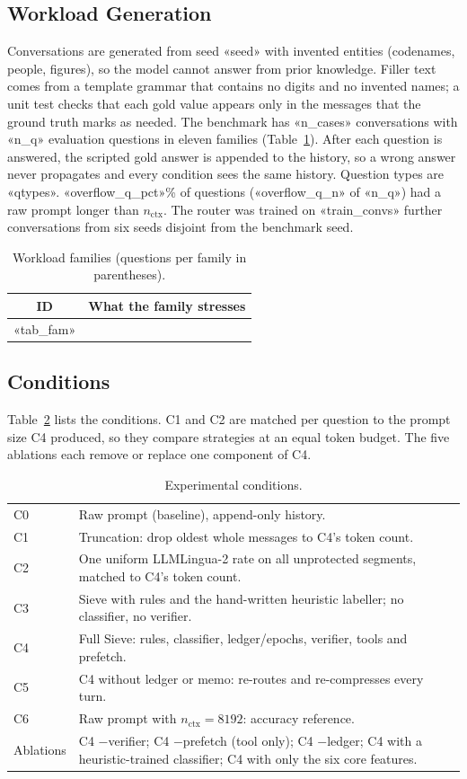 \documentclass[journal]{IEEEtran}
\begin{document}
\subsection{Workload Generation}
Conversations are generated from seed «seed» with invented entities (codenames, people, figures), so the model cannot answer from
prior knowledge. Filler text comes from a template grammar that contains no digits and no invented names; a unit test checks that
each gold value appears only in the messages that the ground truth marks as needed. The benchmark has «n_cases» conversations with
«n_q» evaluation questions in eleven families (Table~\ref{tab:fam}). After each question is answered, the scripted gold answer is
appended to the history, so a wrong answer never propagates and every condition sees the same history. Question types are
«qtypes». «overflow_q_pct»\% of questions («overflow_q_n» of «n_q») had a raw prompt longer than $n_\text{ctx}$. The router was
trained on «train_convs» further conversations from six seeds disjoint from the benchmark seed.
\begin{table}[t]\centering\caption{Workload families (questions per family in parentheses).}\label{tab:fam}\footnotesize
\begin{tabular}{cl}\toprule ID & What the family stresses\\\midrule
«tab_fam»
\bottomrule\end{tabular}\end{table}

\subsection{Conditions}
Table~\ref{tab:cond} lists the conditions. C1 and C2 are matched per question to the prompt size C4 produced, so they compare
strategies at an equal token budget. The five ablations each remove or replace one component of C4.
\begin{table}[t]\centering\caption{Experimental conditions.}\label{tab:cond}\footnotesize\setlength{\tabcolsep}{3pt}
\begin{tabular}{lp{}}\toprule
C0 & Raw prompt (baseline), append-only history.\\
C1 & Truncation: drop oldest whole messages to C4's token count.\\
C2 & One uniform LLMLingua-2 rate on all unprotected segments, matched to C4's token count.\\
C3 & Sieve with rules and the hand-written heuristic labeller; no classifier, no verifier.\\
C4 & Full Sieve: rules, classifier, ledger/epochs, verifier, tools and prefetch.\\
C5 & C4 without ledger or memo: re-routes and re-compresses every turn.\\
C6 & Raw prompt with $n_\text{ctx}=8192$: accuracy reference.\\\midrule
Ablations & C4 $-$verifier; C4 $-$prefetch (tool only); C4 $-$ledger; C4 with a heuristic-trained classifier; C4 with only the six core features.\\
\bottomrule\end{tabular}\end{table}
\end{document}
